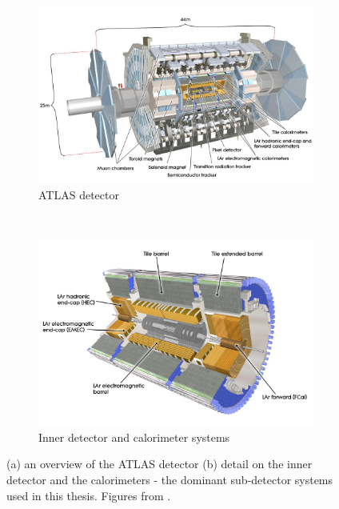 \begin{figure}[p]
  \centering
  \begin{subfigure}[b]{0.9\textwidth}
    \includegraphics[width=\textwidth]{Chapter2/ATLAS.png}
    \caption{ATLAS detector}
    \label{fig:ATLASfull}
  \end{subfigure}
  ~
  \begin{subfigure}[b]{0.9\textwidth}
    \includegraphics[width=\textwidth]{Chapter2/ATLASinner.jpeg}
    \caption{Inner detector and calorimeter systems}
    \label{fig:ATLASinner}
  \end{subfigure}
  \caption{(a) an overview of the ATLAS detector 
           (b) detail on the inner detector and the calorimeters - the dominant
           sub-detector systems used in this thesis. Figures from
           \cite{CERNbook}.}
  \label{fig:ATLAS}
\end{figure}

